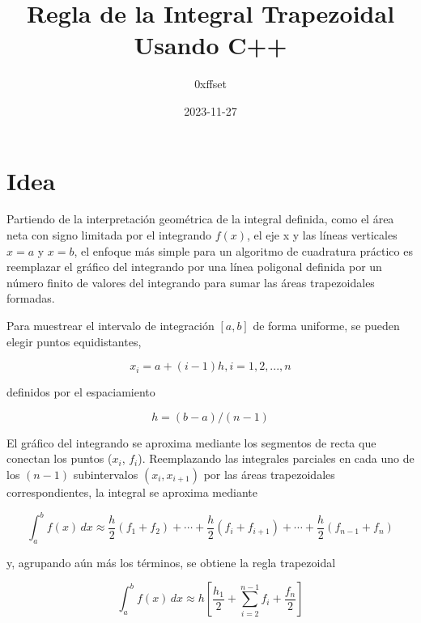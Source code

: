 \title{Regla de la Integral Trapezoidal Usando C++}
\author{0xffset}
\date{2023-11-27}

\maketitle

\section{Idea}

Partiendo de la interpretación geométrica de la integral definida, como el área neta con signo limitada por el integrando $f(x)$, el eje x y las líneas verticales $x=a$ y $x=b$, el enfoque más simple para un algoritmo de cuadratura práctico es reemplazar el gráfico del integrando por una línea poligonal definida por un número finito de valores del integrando para sumar las áreas trapezoidales formadas.

Para muestrear el intervalo de integración $[a,b]$ de forma uniforme, se pueden elegir puntos equidistantes, 

\begin{equation*}
    x_i = a + (i -1)h, i = 1,2,...,n
\end{equation*}

definidos por el espaciamiento 

\begin{equation*}
    h = (b - a)/(n-1)
\end{equation*}

\begin{trapezoidalplot}
\end{trapezoidalplot}

El gráfico del integrando se aproxima mediante los segmentos de recta que conectan los puntos ($x_i$, $f_i$). 
Reemplazando las integrales parciales en cada uno de los $(n-1)$ subintervalos $(x_i, x_{i+1})$ por las áreas trapezoidales correspondientes, la integral se aproxima mediante

\begin{equation*}
\int_a^b f(x)\,dx \approx \frac{h}{2}(f_1 + f_2) + \cdots + \frac{h}{2}(f_i+f_{i+1}) + \cdots + \frac{h}{2}(f_{n-1} + f_n)
\end{equation*}

y, agrupando aún más los términos, se obtiene la regla trapezoidal 

\begin{equation}
    \int_a^b f(x)\,dx \approx h \left[ \frac{h_1}{2} + \sum_{i=2}^{n-1} f_i + \frac{f_n}{2} \right]
\end{equation}

